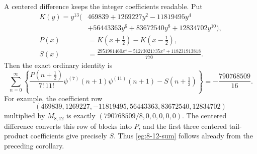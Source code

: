 \documentclass[11pt]{article}
\theoremstyle{definition}
\theoremstyle{remark}
\numberwithin{equation}{section}
\begin{document}
A centered difference keeps the integer coefficients readable. Put
\begin{align*}
 K(y)=y^{13}\bigl(&469839+1269227y^2-11819495y^4\\
                 &+56443363y^6+83672540y^8+12834702y^{10}\bigr),\\
 P(x)&=K(x+\tfrac12)-K(x-\tfrac12),\\
 S(x)&=\frac{2951981460x^4+51273021735x^2+118231913818}{770}.
\end{align*}
Then the exact ordinary identity is
\begin{equation}\label{eg:8-12-sum}
 \boxed{\displaystyle
 \sum_{n=0}^{\infty}\left\{
 \frac{P(n+\tfrac12)}{7!\,11!}
       \psi^{(7)}(n+1)\psi^{(11)}(n+1)-S(n+\tfrac12)\right\}
 =-\frac{790768509}{16}.}
\end{equation}
For example, the coefficient row
\[
 (469839,1269227,-11819495,56443363,83672540,12834702)
\]
multiplied by $M_{8,12}$ is exactly
$(790768509/8,0,0,0,0,0)$. The centered difference converts this row
of blocks into $P$, and the first three centered tail-product
coefficients give precisely $S$. Thus \eqref{eg:8-12-sum} follows
already from the preceding corollary.
\end{document}
